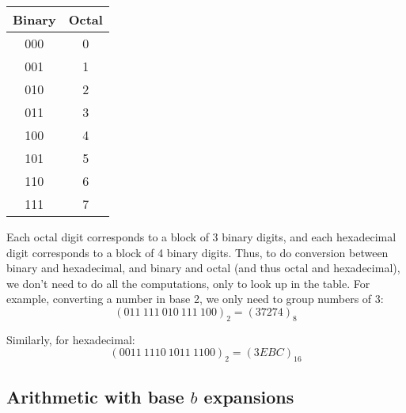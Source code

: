 \documentclass[a4paper]{article}
\begin{document}
{\begin{center}
        \begin{tabular}{|c|c|}
            \hline
            Binary & Octal \\
            \hline
            000    & 0     \\
            \hline
            001    & 1     \\
            \hline
            010    & 2     \\
            \hline
            011    & 3     \\
            \hline
            100    & 4     \\
            \hline
            101    & 5     \\
            \hline
            110    & 6     \\
            \hline
            111    & 7     \\
            \hline
        \end{tabular}
    \end{center}

    Each octal digit corresponds to a block of 3 binary digits, and each hexadecimal digit corresponds to a block of 4 binary digits. Thus, to do conversion between binary and hexadecimal, and binary and octal (and thus octal and hexadecimal), we don't need to do all the computations, only to look up in the table. For example, converting a number in base 2, we only need to group numbers of 3:
    \[\left(011\ 111\ 010\ 111\ 100\right)_2 = \left(37274\right)_8\]

    Similarly, for hexadecimal:
    \[\left(0011\ 1110\ 1011\ 1100\right)_2 = \left(3EBC\right)_{16}\]
}

\subsection{Arithmetic with base $b$ expansions}
\end{document}
